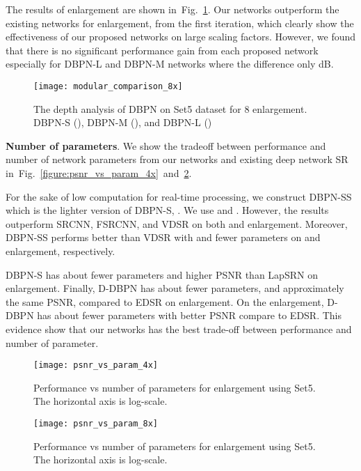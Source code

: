 \documentclass[10pt,journal,compsoc]{IEEEtran}
\begin{document}
The results of  enlargement are shown in~Fig.~\ref{figure:modular_comparison_8x}. 
Our networks outperform the existing networks for  enlargement, from the first  iteration, which clearly show the effectiveness of our proposed networks on large scaling factors. 
However, we found that there is no significant performance gain from each proposed network especially for DBPN-L and DBPN-M networks where the difference only  dB. 
\begin{figure}[t!]
\centering
\texttt{[image: modular\_comparison\_8x]}\vspace{-1.5em}
\caption{The depth analysis of DBPN on Set5 dataset for 8 enlargement. DBPN-S (), DBPN-M (), and DBPN-L ()}
\label{figure:modular_comparison_8x}
\end{figure} 



\noindent \textbf{Number of parameters}. 
We show the tradeoff between performance
and number of network parameters from our networks and existing deep
network SR in~Fig.~\ref{figure:psnr_vs_param_4x}~and~\ref{figure:psnr_vs_param_8x}. 

For the sake of low computation for real-time processing, we construct DBPN-SS which is the lighter version of DBPN-S, . We use  and . However, the results outperform SRCNN, FSRCNN, and VDSR on both  and  enlargement. Moreover, DBPN-SS performs better than VDSR with  and  fewer parameters on  and  enlargement, respectively. 

DBPN-S has about  fewer parameters and higher PSNR than LapSRN on  enlargement. 
Finally, D-DBPN has about  fewer parameters, and
approximately the same PSNR, compared to EDSR on  enlargement. On the  enlargement, D-DBPN has about  fewer parameters with better PSNR compare to EDSR. This evidence show that our networks has the best trade-off between performance and number of parameter.
\begin{figure}[t!]
\centering
\texttt{[image: psnr\_vs\_param\_4x]}\vspace{-1.5em}
\caption{Performance vs number of parameters for  enlargement using Set5. The horizontal axis is log-scale.}
\label{figure:psnr_vs_param_4x}

\texttt{[image: psnr\_vs\_param\_8x]}\vspace{-1.5em}
\caption{Performance vs number of parameters for  enlargement using Set5. The horizontal axis is log-scale.}
\label{figure:psnr_vs_param_8x}
\end{figure} 
\end{document}
